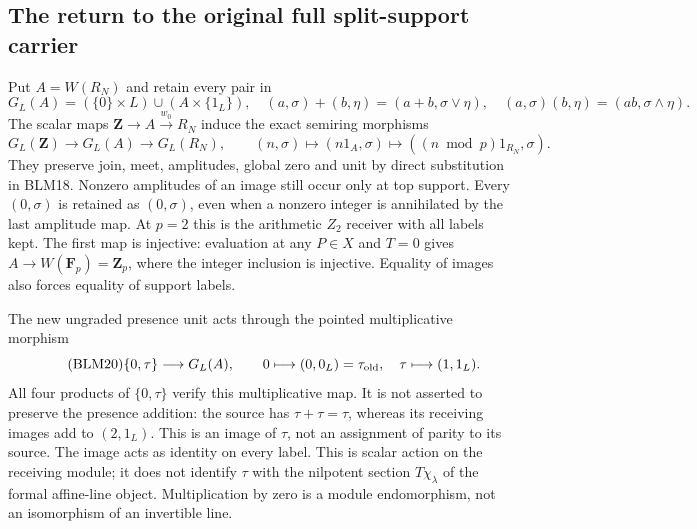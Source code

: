 \subsection{The return to the original full split-support carrier}
Put $A=W(R_N)$ and retain every pair in
\begin{equation}\tag{BLM18}
G_L(A)=(\{0\}\times L)\cup(A\times\{1_L\}),\quad
(a,\sigma)+(b,\eta)=(a+b,\sigma\vee\eta),\quad
(a,\sigma)(b,\eta)=(ab,\sigma\wedge\eta).
\end{equation}
The scalar maps $\mathbf Z\to A\xrightarrow{w_0}R_N$
induce the exact semiring morphisms
\begin{equation}\tag{BLM19}
G_L(\mathbf Z)\longrightarrow G_L(A)\longrightarrow G_L(R_N),
\qquad (n,\sigma)\longmapsto(n1_A,\sigma)
\longmapsto((n\bmod p)1_{R_N},\sigma).
\end{equation}
They preserve join, meet, amplitudes, global zero and unit by
direct substitution in BLM18. Nonzero amplitudes of an image
still occur only at top support. Every $(0,\sigma)$ is
retained as $(0,\sigma)$, even when a nonzero integer is
annihilated by the last amplitude map. At $p=2$ this is
the arithmetic $Z_2$ receiver with all labels kept.
The first map is injective: evaluation at any $P\in X$ and
$T=0$ gives $A\to W(\mathbf F_p)=\mathbf Z_p$, where the
integer inclusion is injective. Equality of images also
forces equality of support labels.

The new ungraded presence unit acts through the pointed
multiplicative morphism
\begin{equation}\tag{BLM20}
\{0,\tau\}\longrightarrow G_L(A),\qquad
0\longmapsto(0,0_L)=\tau_{\rm old},\quad
\tau\longmapsto(1,1_L).
\end{equation}
All four products of $\{0,\tau\}$ verify this multiplicative map. It is not asserted to preserve the presence addition: the source has $\tau+\tau=\tau$, whereas its receiving images add to $(2,1_L)$. This is an image of $\tau$, not an assignment of parity
to its source. The image acts as identity on every label. This is scalar action on the receiving module; it does not identify $\tau$ with the nilpotent section $T\chi_\lambda$ of the formal affine-line object. Multiplication by zero is a module endomorphism, not an isomorphism of an invertible line.

